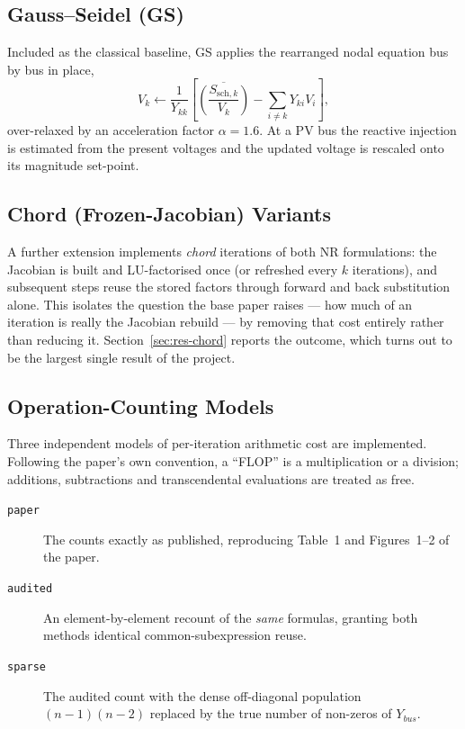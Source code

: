 \documentclass[sigconf,nonacm]{acmart}
\begin{document}
\subsection{Gauss--Seidel (GS)}
Included as the classical baseline, GS applies the rearranged nodal equation
bus by bus in place,
\begin{equation}
V_k \leftarrow \frac{1}{Y_{kk}}
  \left[\overline{\left(\frac{S_{\mathrm{sch},k}}{V_k}\right)}
        - \sum_{i\neq k} Y_{ki}V_i\right],
\end{equation}
over-relaxed by an acceleration factor $\alpha = 1.6$. At a PV bus the reactive
injection is estimated from the present voltages and the updated voltage is
rescaled onto its magnitude set-point.

\subsection{Chord (Frozen-Jacobian) Variants}
A further extension implements \emph{chord} iterations of both NR formulations:
the Jacobian is built and LU-factorised once (or refreshed every $k$
iterations), and subsequent steps reuse the stored factors through forward and
back substitution alone. This isolates the question the base paper raises ---
how much of an iteration is really the Jacobian rebuild --- by removing that
cost entirely rather than reducing it. Section~\ref{sec:res-chord} reports the
outcome, which turns out to be the largest single result of the project.

\subsection{Operation-Counting Models}
\label{sec:method-flops}
Three independent models of per-iteration arithmetic cost are implemented.
Following the paper's own convention, a ``FLOP'' is a multiplication or a
division; additions, subtractions and transcendental evaluations are treated as
free.

\begin{description}
\item[\texttt{paper}] The counts exactly as published, reproducing Table~1 and
  Figures~1--2 of the paper.
\item[\texttt{audited}] An element-by-element recount of the \emph{same}
  formulas, granting both methods identical common-subexpression reuse.
\item[\texttt{sparse}] The audited count with the dense off-diagonal population
  $(n-1)(n-2)$ replaced by the true number of non-zeros of $Y_{bus}$.
\end{description}
\end{document}
